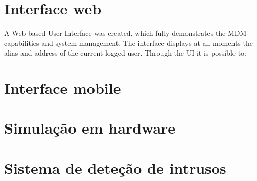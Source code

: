 \section{Interface web}


A Web-based User Interface was created, which fully demonstrates the MDM capabilities
and system management. The interface displays at all moments the alias and address of the
current logged user.
Through the UI it is possible to:

\section{Interface mobile}





\section{Simulação em hardware}


\section{Sistema de deteção de intrusos}

